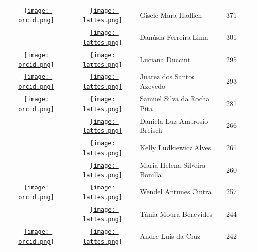 \documentclass[12pt,brazil]{article}\usepackage[]{graphicx}\usepackage[]{xcolor}
\begin{document}
\begin{longtable}{cclrll}
\href{https://orcid.org/0000-0002-6304-0988}{\texttt{[image: orcid.png]}} & \href{http://lattes.cnpq.br/0146453135230315}{\texttt{[image: lattes.png]}} & Gisele Mara Hadlich & 371 &  &  \\

 & \href{http://lattes.cnpq.br/3488835911770590}{\texttt{[image: lattes.png]}} & Danúsia Ferreira Lima & 301 &  &  \\

\href{https://orcid.org/0000-0001-8430-683X}{\texttt{[image: orcid.png]}} & \href{http://lattes.cnpq.br/4955543481325525}{\texttt{[image: lattes.png]}} & Luciana Duccini & 295 &  &  \\

\href{https://orcid.org/0000-0002-3641-7604}{\texttt{[image: orcid.png]}} & \href{http://lattes.cnpq.br/1750344103498728}{\texttt{[image: lattes.png]}} & Juarez dos Santos Azevedo & 293 &  &  \\

\href{https://orcid.org/0000-0003-4053-8721}{\texttt{[image: orcid.png]}} & \href{http://lattes.cnpq.br/8313800478632324}{\texttt{[image: lattes.png]}} & Samuel Silva da Rocha Pita & 281 &  &  \\

 & \href{http://lattes.cnpq.br/4565288308885394}{\texttt{[image: lattes.png]}} & Daniela Luz Ambrosio Breisch & 266 &  &  \\

 & \href{http://lattes.cnpq.br/4826659465325371}{\texttt{[image: lattes.png]}} & Kelly Ludkiewicz Alves & 261 &  &  \\

 & \href{http://lattes.cnpq.br/2730520955520609}{\texttt{[image: lattes.png]}} & Maria Helena Silveira Bonilla & 260 &  &  \\

\href{https://orcid.org/0000-0001-6075-8938}{\texttt{[image: orcid.png]}} & \href{http://lattes.cnpq.br/0111570761757444}{\texttt{[image: lattes.png]}} & Wendel Antunes Cintra & 257 &  &  \\

 & \href{http://lattes.cnpq.br/2494548196605610}{\texttt{[image: lattes.png]}} & Tânia Moura Benevides & 244 &  &  \\

\href{https://orcid.org/0000-0003-1638-4398}{\texttt{[image: orcid.png]}} & \href{http://lattes.cnpq.br/7861151975882619}{\texttt{[image: lattes.png]}} & Andre Luis da Cruz & 242 &  &  \\


\end{longtable}
\end{document}
